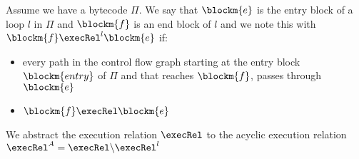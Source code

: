 
\begin{defn}
\label{defLoop}
Assume we have a bytecode $\Pi$. We say that $\blockm{e}$ is the entry block of a loop $l$ in $\Pi$ and $\blockm{f}$ is an end block of $l$ and we note this with  
 $\blockm{f} \execRel^l \blockm{e}$ if:
\begin{itemize}
\item every path in the control flow graph starting at the entry block $\blockm{entry}$ of $\Pi$ and that reaches $\blockm{f}$, passes through  $\blockm{e}$ 
\item $\blockm{f} \execRel \blockm{e}$

\end{itemize}
\end{defn}


We abstract the execution relation $\execRel$ to the acyclic execution relation $\execRel^A = \execRel \backslash \execRel^l $




